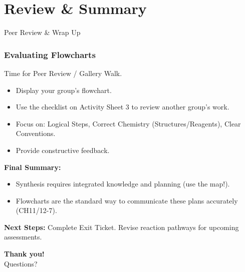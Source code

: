 \documentclass[xcolor=svgnames]{beamer}
\begin{document}
\section{Review & Summary}
\begin{frame}{Peer Review & Wrap Up}
    \frametitle{Evaluating Flowcharts}
    Time for Peer Review / Gallery Walk.
    \vspace{1em}
    \begin{itemize}
        \item Display your group's flowchart.
        \item Use the checklist on Activity Sheet 3 to review another group's work.
        \item Focus on: Logical Steps, Correct Chemistry (Structures/Reagents), Clear Conventions.
        \item Provide constructive feedback.
    \end{itemize}
    \vspace{1em}
    \textbf{Final Summary:}
    \begin{itemize}
        \item Synthesis requires integrated knowledge and planning (use the map!).
        \item Flowcharts are the standard way to communicate these plans accurately (CH11/12-7).
    \end{itemize}
    \vspace{1em}
    \textbf{Next Steps:} Complete Exit Ticket. Revise reaction pathways for upcoming assessments.
\end{frame}

\begin{frame}
    \centering
    \textbf{Thank you!}\\ \vspace{1em} Questions?
\end{frame}
\end{document}
